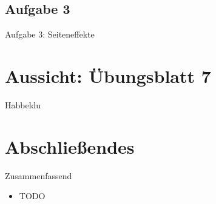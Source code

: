 \subsection{Aufgabe 3}
\begin{frame}{Aufgabe 3: Seiteneffekte}

\end{frame}

\iffull
{}
\section{Aussicht: Übungsblatt 7}
\begin{frame}{Habbeldu}
\end{frame}
\fi

\section{Abschließendes}
{\SummaryFrame
\begin{frame}[t]{Zusammenfassend}
\pause \printBibCommand
\vfill\vfill %
\begin{itemize}[<+(1)->]
    \itemsep5pt
    \item TODO
\end{itemize}
\end{frame}
}




\iffull\fi
